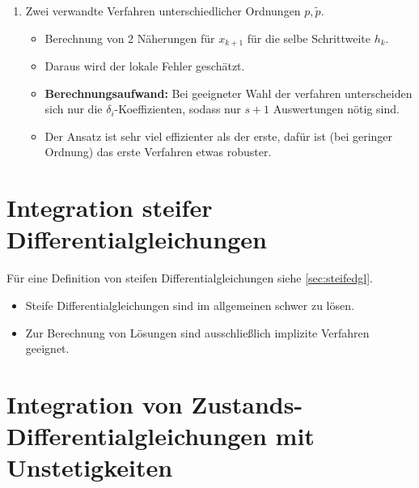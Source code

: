 \begin{itemize}
\begin{enumerate}
\begin{itemize}
							\end{itemize}
						\item Zwei verwandte Verfahren unterschiedlicher Ordnungen \( p, \tilde{p} \).
							\begin{itemize}
								\item Berechnung von 2 Näherungen für \( x _ { k + 1 } \) für die selbe Schrittweite \( h _ k \).
								\item Daraus wird der lokale Fehler geschätzt.
								\item \textbf{Berechnungsaufwand:} Bei geeigneter Wahl der verfahren unterscheiden sich nur die \( \delta _ i \)-Koeffizienten, sodass nur \( s + 1 \) Auswertungen nötig sind.
								\item Der Ansatz ist sehr viel effizienter als der erste, dafür ist (bei geringer Ordnung) das erste Verfahren etwas robuster.
							\end{itemize}
					\end{enumerate}
			\end{itemize}

	\section{Integration steifer Differentialgleichungen} %
		Für eine Definition von steifen Differentialgleichungen siehe \ref{sec:steifedgl}.

		\begin{itemize}
			\item Steife Differentialgleichungen sind im allgemeinen schwer zu lösen.
			\item Zur Berechnung von Lösungen sind ausschließlich implizite Verfahren geeignet.
		\end{itemize}

	\section{Integration von Zustands-Differentialgleichungen mit Unstetigkeiten} %
		\label{sec:integrationunstetig}


